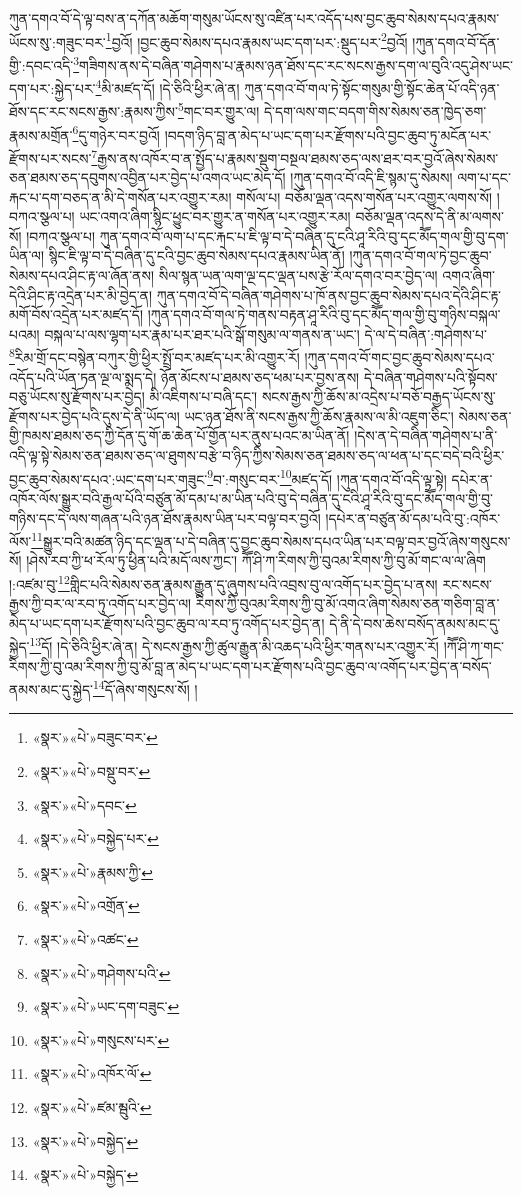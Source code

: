 ཀུན་དགའ་བོ་དེ་ལྟ་བས་ན་དཀོན་མཆོག་གསུམ་ཡོངས་སུ་འཛིན་པར་འདོད་པས་བྱང་ཆུབ་སེམས་དཔའ་རྣམས་ཡོངས་སུ་:གཟུང་བར་\footnote{«སྣར་»«པེ་»བཟུང་བར་}བྱའོ། །བྱང་ཆུབ་སེམས་དཔའ་རྣམས་ཡང་དག་པར་:སྡུད་པར་\footnote{«སྣར་»«པེ་»བསྡུ་བར་}བྱའོ། །ཀུན་དགའ་བོ་དོན་གྱི་:དབང་འདི་\footnote{«སྣར་»«པེ་»དབང་}གཟིགས་ནས་དེ་བཞིན་གཤེགས་པ་རྣམས་ཉན་ཐོས་དང་རང་སངས་རྒྱས་དག་ལ་བུའི་འདུ་ཤེས་ཡང་དག་པར་:སྐྱེད་པར་\footnote{«སྣར་»«པེ་»བསྐྱེད་པར་}མི་མཛད་དོ། །དེ་ཅིའི་ཕྱིར་ཞེ་ན། ཀུན་དགའ་བོ་གལ་ཏེ་སྟོང་གསུམ་གྱི་སྟོང་ཆེན་པོ་འདི་ཉན་ཐོས་དང་རང་སངས་རྒྱས་:རྣམས་ཀྱིས་\footnote{«སྣར་»«པེ་»རྣམས་ཀྱི་}གང་བར་གྱུར་ལ། དེ་དག་ལས་གང་བདག་གིས་སེམས་ཅན་ཁྱེད་ཅག་རྣམས་མགྲོན་\footnote{«སྣར་»«པེ་»འགྲོན་}དུ་གཉེར་བར་བྱའོ། །བདག་ཉིད་བླ་ན་མེད་པ་ཡང་དག་པར་རྫོགས་པའི་བྱང་ཆུབ་ཏུ་མངོན་པར་རྫོགས་པར་སངས་\footnote{«སྣར་»«པེ་»འཚང་}རྒྱས་ནས་འཁོར་བ་ན་སྤྱོད་པ་རྣམས་སྡུག་བསྔལ་ཐམས་ཅད་ལས་ཐར་བར་བྱའོ་ཞེས་སེམས་ཅན་ཐམས་ཅད་དབུགས་འབྱིན་པར་བྱེད་པ་འགའ་ཡང་མེད་དོ། །ཀུན་དགའ་བོ་འདི་ཇི་སྙམ་དུ་སེམས། ལག་པ་དང་རྐང་པ་དག་བཅད་ན་མི་དེ་གསོན་པར་འགྱུར་རམ། གསོལ་པ། བཅོམ་ལྡན་འདས་གསོན་པར་འགྱུར་ལགས་སོ། །བཀའ་སྩལ་པ། ཡང་འགའ་ཞིག་སྙིང་ཕྱུང་བར་གྱུར་ན་གསོན་པར་འགྱུར་རམ། བཅོམ་ལྡན་འདས་དེ་ནི་མ་ལགས་སོ། །བཀའ་སྩལ་པ། ཀུན་དགའ་བོ་ལག་པ་དང་རྐང་པ་ཇི་ལྟ་བ་དེ་བཞིན་དུ་ངའི་ཤཱ་རིའི་བུ་དང་མཽད་གལ་གྱི་བུ་དག་ཡིན་ལ། སྙིང་ཇི་ལྟ་བ་དེ་བཞིན་དུ་ངའི་བྱང་ཆུབ་སེམས་དཔའ་རྣམས་ཡིན་ནོ། །ཀུན་དགའ་བོ་གལ་ཏེ་བྱང་ཆུབ་སེམས་དཔའ་ཤིང་རྟ་ལ་ཞོན་ནས། སིལ་སྙན་ཡན་ལག་ལྔ་དང་ལྡན་པས་རྩེ་རོལ་དགའ་བར་བྱེད་ལ། འགའ་ཞིག་དེའི་ཤིང་རྟ་འདྲེན་པར་མི་བྱེད་ན། ཀུན་དགའ་བོ་དེ་བཞིན་གཤེགས་པ་ཁོ་ནས་བྱང་ཆུབ་སེམས་དཔའ་དེའི་ཤིང་རྟ་མགོ་བོས་འདྲེན་པར་མཛད་དོ། །ཀུན་དགའ་བོ་གལ་ཏེ་གནས་བརྟན་ཤཱ་རིའི་བུ་དང་མཽད་གལ་གྱི་བུ་གཉིས་བསྐལ་པའམ། བསྐལ་པ་ལས་ལྷག་པར་རྣམ་པར་ཐར་པའི་སྒོ་གསུམ་ལ་གནས་ན་ཡང་། དེ་ལ་དེ་བཞིན་:གཤེགས་པ་\footnote{«སྣར་»«པེ་»གཤེགས་པའི་}རིམ་གྲོ་དང་བསྙེན་བཀུར་གྱི་ཕྱིར་སྤྲོ་བར་མཛད་པར་མི་འགྱུར་རོ། །ཀུན་དགའ་བོ་གང་བྱང་ཆུབ་སེམས་དཔའ་འདོད་པའི་ཡོན་ཏན་ལྔ་ལ་སྨད་དེ། ཉོན་མོངས་པ་ཐམས་ཅད་ཕམ་པར་བྱས་ནས། དེ་བཞིན་གཤེགས་པའི་སྟོབས་བཅུ་ཡོངས་སུ་རྫོགས་པར་བྱེད། མི་འཇིགས་པ་བཞི་དང་། སངས་རྒྱས་ཀྱི་ཆོས་མ་འདྲེས་པ་བཅོ་བརྒྱད་ཡོངས་སུ་རྫོགས་པར་བྱེད་པའི་དུས་དེ་ནི་ཡོད་ལ། ཡང་ཉན་ཐོས་ནི་སངས་རྒྱས་ཀྱི་ཆོས་རྣམས་ལ་མི་འཇུག་ཅིང་། སེམས་ཅན་གྱི་ཁམས་ཐམས་ཅད་ཀྱི་དོན་དུ་གོ་ཆ་ཆེན་པོ་གྱོན་པར་ནུས་པའང་མ་ཡིན་ནོ། །དེས་ན་དེ་བཞིན་གཤེགས་པ་ནི་འདི་ལྟ་སྟེ་སེམས་ཅན་ཐམས་ཅད་ལ་ཐུགས་བརྩེ་བ་ཉིད་ཀྱིས་སེམས་ཅན་ཐམས་ཅད་ལ་ཕན་པ་དང་བདེ་བའི་ཕྱིར་བྱང་ཆུབ་སེམས་དཔའ་:ཡང་དག་པར་གཟུང་\footnote{«སྣར་»«པེ་»ཡང་དག་བཟུང་}བ་:གསུང་བར་\footnote{«སྣར་»«པེ་»གསུངས་པར་}མཛད་དོ། །ཀུན་དགའ་བོ་འདི་ལྟ་སྟེ། དཔེར་ན་འཁོར་ལོས་སྒྱུར་བའི་རྒྱལ་པོའི་བཙུན་མོ་དམ་པ་མ་ཡིན་པའི་བུ་དེ་བཞིན་དུ་ངའི་ཤཱ་རིའི་བུ་དང་མཽད་གལ་གྱི་བུ་གཉིས་དང་དེ་ལས་གཞན་པའི་ཉན་ཐོས་རྣམས་ཡིན་པར་བལྟ་བར་བྱའོ། །དཔེར་ན་བཙུན་མོ་དམ་པའི་བུ་:འཁོར་ལོས་\footnote{«སྣར་»«པེ་»འཁོར་ལོ་}སྒྱུར་བའི་མཚན་ཉིད་དང་ལྡན་པ་དེ་བཞིན་དུ་བྱང་ཆུབ་སེམས་དཔའ་ཡིན་པར་བལྟ་བར་བྱའོ་ཞེས་གསུངས་སོ། །ཤེས་རབ་ཀྱི་ཕ་རོལ་ཏུ་ཕྱིན་པའི་མདོ་ལས་ཀྱང་། ཀཽ་ཤི་ཀ་རིགས་ཀྱི་བུའམ་རིགས་ཀྱི་བུ་མོ་གང་ལ་ལ་ཞིག །:འཛམ་བུ་\footnote{«སྣར་»«པེ་»ཛམ་མྦུའི་}གླིང་པའི་སེམས་ཅན་རྣམས་རྒྱུན་དུ་ཞུགས་པའི་འབྲས་བུ་ལ་འགོད་པར་བྱེད་པ་ནས། རང་སངས་རྒྱས་ཀྱི་བར་ལ་རབ་ཏུ་འགོད་པར་བྱེད་ལ། རིགས་ཀྱི་བུའམ་རིགས་ཀྱི་བུ་མོ་འགའ་ཞིག་སེམས་ཅན་གཅིག་བླ་ན་མེད་པ་ཡང་དག་པར་རྫོགས་པའི་བྱང་ཆུབ་ལ་རབ་ཏུ་འགོད་པར་བྱེད་ན། དེ་ནི་དེ་བས་ཆེས་བསོད་ནམས་མང་དུ་སྐྱེད་\footnote{«སྣར་»«པེ་»བསྐྱེད་}དོ། །དེ་ཅིའི་ཕྱིར་ཞེ་ན། དེ་སངས་རྒྱས་ཀྱི་ཚུལ་རྒྱུན་མི་འཆད་པའི་ཕྱིར་གནས་པར་འགྱུར་རོ། །ཀཽ་ཤི་ཀ་གང་རིགས་ཀྱི་བུ་འམ་རིགས་ཀྱི་བུ་མོ་བླ་ན་མེད་པ་ཡང་དག་པར་རྫོགས་པའི་བྱང་ཆུབ་ལ་འགོད་པར་བྱེད་ན་བསོད་ནམས་མང་དུ་སྐྱེད་\footnote{«སྣར་»«པེ་»བསྐྱེད་}དོ་ཞེས་གསུངས་སོ། །
